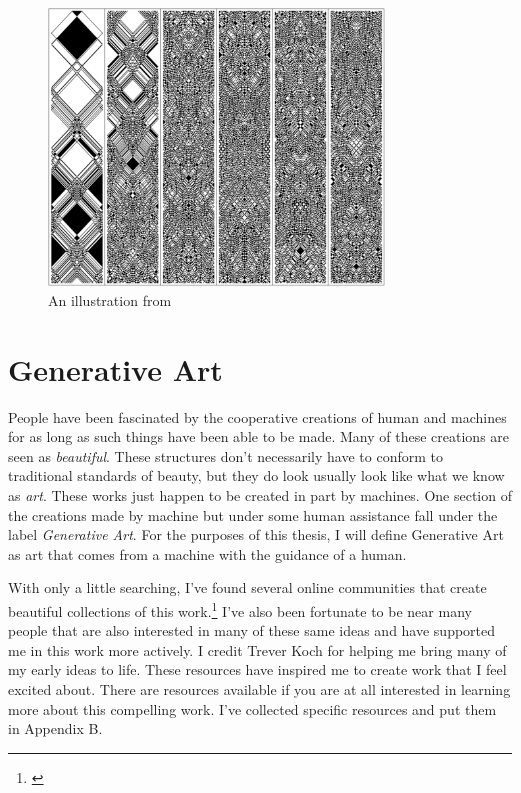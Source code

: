 \documentclass[12pt,twoside]{reedthesis}
\begin{document}
	\begin{figure}[H]
	\centering
	\includegraphics[height=2.9in]{Images/Wolfram}
	\caption{An illustration from \cite{wolfram2002}}
	\label{Wolfram}
	\end{figure}

\section{Generative Art}
\label{GenerativeArt}

	People have been fascinated by the cooperative creations of human and machines for as long as such things have been able to be made. Many of these creations are seen as \textit{beautiful}. These structures don't necessarily have to conform to traditional standards of beauty, but they do look usually look like what we know as \textit{art}. These works just happen to be created in part by machines. One section of the creations made by machine but under some human assistance fall under the label \textit{Generative Art}. For the purposes of this thesis, I will define Generative Art as art that comes from a machine with the guidance of a human.
	
	With only a little searching, I've found several online communities that create beautiful collections of this work.\footnote{\cite{reddit2023}} I've also been fortunate to be near many people that are also interested in many of these same ideas and have supported me in this work more actively. I credit Trever Koch for helping me bring many of my early ideas to life. These resources have inspired me to create work that I feel excited about. There are resources available if you are at all interested in learning more about this compelling work. I've collected specific resources and put them in Appendix B.
	
	
\end{document}
